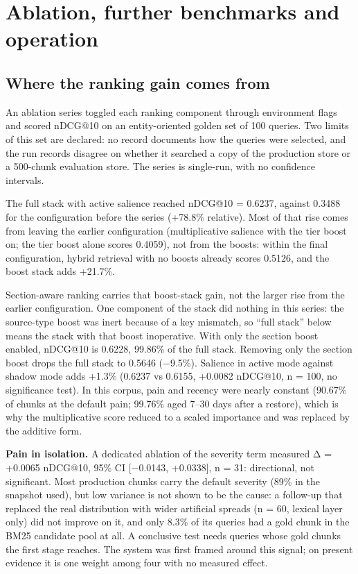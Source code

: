 \documentclass[a4paper,fleqn]{cas-sc}
\begin{document}
\section{Ablation, further benchmarks and operation}

\subsection{Where the ranking gain comes from}

An ablation series toggled each ranking component through environment flags and scored nDCG@10 on an entity-oriented golden set of 100 queries. Two limits of this set are declared: no record documents how the queries were selected, and the run records disagree on whether it searched a copy of the production store or a 500-chunk evaluation store. The series is single-run, with no confidence intervals.

The full stack with active salience reached nDCG@10 = 0.6237, against 0.3488 for the configuration before the series (+78.8\% relative). Most of that rise comes from leaving the earlier configuration (multiplicative salience with the tier boost on; the tier boost alone scores 0.4059), not from the boosts: within the final configuration, hybrid retrieval with no boosts already scores 0.5126, and the boost stack adds +21.7\%.

Section-aware ranking carries that boost-stack gain, not the larger rise from the earlier configuration. One component of the stack did nothing in this series: the source-type boost was inert because of a key mismatch, so ``full stack'' below means the stack with that boost inoperative. With only the section boost enabled, nDCG@10 is 0.6228, 99.86\% of the full stack. Removing only the section boost drops the full stack to 0.5646 (−9.5\%). Salience in active mode against shadow mode adds +1.3\% (0.6237 vs 0.6155, +0.0082 nDCG@10, n = 100, no significance test). In this corpus, pain and recency were nearly constant (90.67\% of chunks at the default pain; 99.76\% aged 7--30 days after a restore), which is why the multiplicative score reduced to a scaled importance and was replaced by the additive form.

\textbf{Pain in isolation.} A dedicated ablation of the severity term measured Δ = +0.0065 nDCG@10, 95\% CI {[}−0.0143, +0.0338{]}, n = 31: directional, not significant. Most production chunks carry the default severity (89\% in the snapshot used), but low variance is not shown to be the cause: a follow-up that replaced the real distribution with wider artificial spreads (n = 60, lexical layer only) did not improve on it, and only 8.3\% of its queries had a gold chunk in the BM25 candidate pool at all. A conclusive test needs queries whose gold chunks the first stage reaches. The system was first framed around this signal; on present evidence it is one weight among four with no measured effect.
\end{document}
